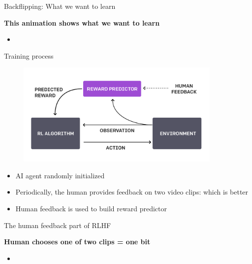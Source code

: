 \begin{vbframe}{Backflipping: What we want to learn}

\vfill

\textbf{This animation shows what we want to learn}

	\begin{itemize}
		\item \href{https://images.openai.com/blob/cf6fdf49-ea9e-489d-a1f1-9753291cd09e/humanfeedbackjump.gif}{}

	\end{itemize}

\vfill

\end{vbframe}

\begin{vbframe}{Training process}

\vfill

\begin{figure}
\centering
\includegraphics[width = 10cm]{figure/trainingprocess.png}
\end{figure}

\begin{itemize}
	\item AI agent randomly initialized
	\item Periodically, the human provides feedback on
	two video clips: which is better
        \item Human feedback is used to build reward predictor
\end{itemize}

\vfill

\end{vbframe}


\begin{vbframe}{The human feedback part of RLHF}

\vfill

\textbf{Human chooses one of two clips = one bit}

	\begin{itemize}
		\item \href{https://player.vimeo.com/video/754042470?h=e64a40690d&badge=0&autopause=0&player_id=0&app_id=58479}{}

	\end{itemize}

\vfill

\end{vbframe}



